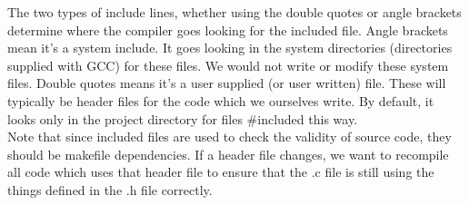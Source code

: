 The two types of include lines, whether using the double quotes or angle brackets determine where the compiler goes looking for the included file. 
Angle brackets mean it's a system include. It goes looking in the system directories (directories supplied with GCC) for these files. 
We would not write or modify these system files.
Double quotes means it's a user supplied (or user written) file. These will typically be header files for the code which we ourselves write. By default, it looks only in the project directory for files \#included this way.\\

Note that since included files are used to check the validity of source code, they should be makefile dependencies. If a header file changes, we want to recompile all code which uses that header file to ensure that the .c file is still using the things defined in the .h file correctly.
